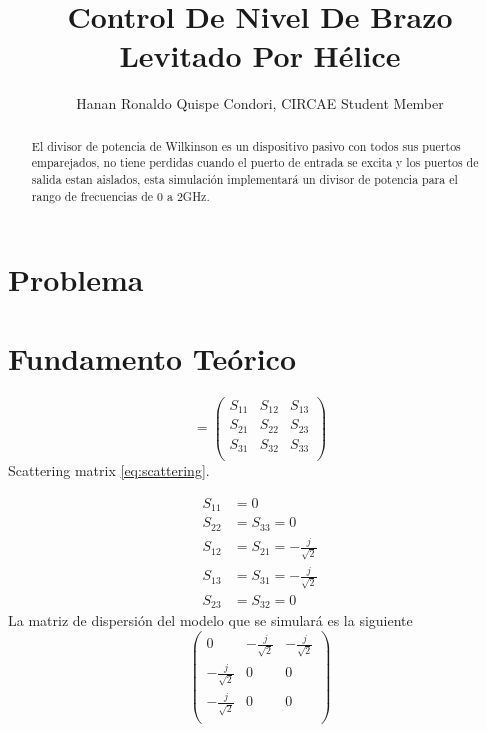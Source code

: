 \documentclass[a4paper]{IEEEtran} %
\begin{document}
\title{Control De Nivel De Brazo Levitado Por Hélice}
\author{Hanan Ronaldo Quispe Condori, CIRCAE Student Member}
\maketitle
\begin{abstract}
El divisor de potencia de Wilkinson es un dispositivo pasivo con todos sus puertos emparejados, no tiene perdidas cuando el puerto de entrada se excita y los puertos de salida estan aislados, esta simulación implementará un divisor de potencia para el rango de frecuencias de 0 a 2GHz.
\end{abstract}

\section{Problema}
\label{sec:Problem}

\section{Fundamento Teórico}
\label{sec:fundamento}

\vspace{5mm}
\begin{equation}
[S]=
\begin{pmatrix}
S_{11}&S_{12}&S_{13}\\
S_{21}&S_{22}&S_{23}\\
S_{31}&S_{32}&S_{33}\\
\end{pmatrix}
\label{eq:scattering}
\end{equation}
Scattering matrix \ref{eq:scattering}.
\vspace{5mm}




\begin{equation}
\begin{split}
    S_{11}&=0 \\
    S_{22}&=S_{33}=0 \\
    S_{12}&=S_{21}=-\frac{j}{\sqrt{2}}\\
    S_{13}&=S_{31}=-\frac{j}{\sqrt{2}}\\
    S_{23}&=S_{32}=0
\end{split}
    \label{eq:parametros}
\end{equation}
La matriz de dispersión del modelo que se simulará es la siguiente
\begin{equation}
    \begin{pmatrix}
    0&-\frac{j}{\sqrt{2}}&-\frac{j}{\sqrt{2}}\\
    -\frac{j}{\sqrt{2}}&0&0\\
    -\frac{j}{\sqrt{2}}&0&0\\
    \end{pmatrix}
    \label{eq:matrix_numbers}
\end{equation}
\end{document}
